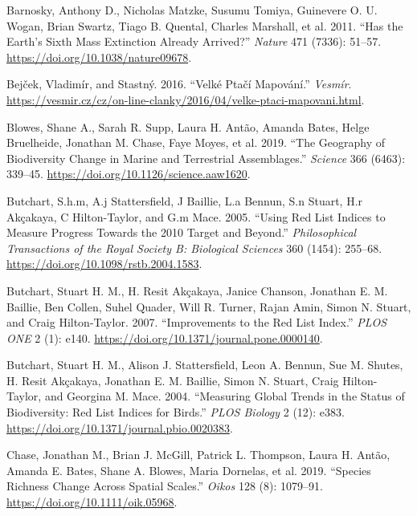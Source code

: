 \documentclass[
  12pt,
  oneside]{report}
\begin{document}
\hypertarget{refs}{}
\leavevmode\hypertarget{ref-barnosky_has_2011}{}%
Barnosky, Anthony D., Nicholas Matzke, Susumu Tomiya, Guinevere O. U. Wogan, Brian Swartz, Tiago B. Quental, Charles Marshall, et al. 2011. ``Has the Earth's Sixth Mass Extinction Already Arrived?'' \emph{Nature} 471 (7336): 51--57. \url{https://doi.org/10.1038/nature09678}.

\leavevmode\hypertarget{ref-bejcek_velke_2016}{}%
Bejček, Vladimír, and Stastný. 2016. ``Velké Ptačí Mapování.'' \emph{Vesmír}. \url{https://vesmir.cz/cz/on-line-clanky/2016/04/velke-ptaci-mapovani.html}.

\leavevmode\hypertarget{ref-blowes_geography_2019}{}%
Blowes, Shane A., Sarah R. Supp, Laura H. Antão, Amanda Bates, Helge Bruelheide, Jonathan M. Chase, Faye Moyes, et al. 2019. ``The Geography of Biodiversity Change in Marine and Terrestrial Assemblages.'' \emph{Science} 366 (6463): 339--45. \url{https://doi.org/10.1126/science.aaw1620}.

\leavevmode\hypertarget{ref-butchart_using_2005}{}%
Butchart, S.h.m, A.j Stattersfield, J Baillie, L.a Bennun, S.n Stuart, H.r Akçakaya, C Hilton-Taylor, and G.m Mace. 2005. ``Using Red List Indices to Measure Progress Towards the 2010 Target and Beyond.'' \emph{Philosophical Transactions of the Royal Society B: Biological Sciences} 360 (1454): 255--68. \url{https://doi.org/10.1098/rstb.2004.1583}.

\leavevmode\hypertarget{ref-butchart_improvements_2007}{}%
Butchart, Stuart H. M., H. Resit Akçakaya, Janice Chanson, Jonathan E. M. Baillie, Ben Collen, Suhel Quader, Will R. Turner, Rajan Amin, Simon N. Stuart, and Craig Hilton-Taylor. 2007. ``Improvements to the Red List Index.'' \emph{PLOS ONE} 2 (1): e140. \url{https://doi.org/10.1371/journal.pone.0000140}.

\leavevmode\hypertarget{ref-butchart_measuring_2004}{}%
Butchart, Stuart H. M., Alison J. Stattersfield, Leon A. Bennun, Sue M. Shutes, H. Resit Akçakaya, Jonathan E. M. Baillie, Simon N. Stuart, Craig Hilton-Taylor, and Georgina M. Mace. 2004. ``Measuring Global Trends in the Status of Biodiversity: Red List Indices for Birds.'' \emph{PLOS Biology} 2 (12): e383. \url{https://doi.org/10.1371/journal.pbio.0020383}.

\leavevmode\hypertarget{ref-chase_species_2019}{}%
Chase, Jonathan M., Brian J. McGill, Patrick L. Thompson, Laura H. Antão, Amanda E. Bates, Shane A. Blowes, Maria Dornelas, et al. 2019. ``Species Richness Change Across Spatial Scales.'' \emph{Oikos} 128 (8): 1079--91. \url{https://doi.org/10.1111/oik.05968}.
\end{document}

